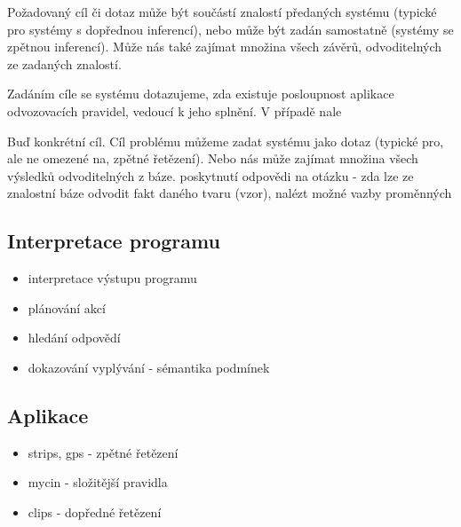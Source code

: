 Požadovaný cíl či dotaz může být součástí znalostí předaných systému (typické
pro systémy s dopřednou inferencí), nebo může být zadán samostatně (systémy se
zpětnou inferencí). Může nás také zajímat množina všech závěrů, odvoditelných ze
zadaných znalostí.

Zadáním cíle se systému dotazujeme, zda existuje posloupnost aplikace
odvozovacích pravidel, vedoucí k jeho splnění. V případě nale

Buď konkrétní cíl.
Cíl problému můžeme zadat systému jako dotaz (typické pro, ale ne omezené na,
zpětné řetězení).
Nebo nás může zajímat množina všech výsledků odvoditelných z báze.
poskytnutí odpovědi na otázku - zda lze ze znalostní báze odvodit fakt daného
tvaru (vzor), nalézt možné vazby proměnných

\subsection{Interpretace programu}
\begin{framed}
  \begin{itemize}
    \item interpretace výstupu programu
    \item plánování akcí
    \item hledání odpovědí
    \item dokazování vyplývání - sémantika podmínek
  \end{itemize}
\end{framed}

\subsection{Aplikace}
\begin{framed}
  \begin{itemize}
    \item strips, gps - zpětné řetězení
    \item mycin - složitější pravidla
    \item clips - dopředné řetězení
  \end{itemize}
\end{framed}

